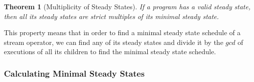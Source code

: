 \documentclass{sig-alt-full}
\newtheorem{theorem}{Theorem}
\newtheorem{corollary}{Corollary}
\begin{document}
\begin{comment}
The above lemma is true because neither $m$ nor $q$ change the
amount of data buffered in the {\Channels}.  Thus a composition of
the steady states does not change the amount of data buffered in
the {\Channels}, which makes the composition also a steady schedule.

\begin{corollary}[Composition of Steady Schedules]
\label{corollary:composition}
If $m$ and $q$ are two steady states, and $\forall i, m_i > q_i$,
then $w = m - q$ is also a steady state.
\end{corollary}

If $q$ is a steady state and $m = w + q$ is a steady state, then
$w$ must not change the amount of data buffered in {\Channels}. Thus
$w$ must be a steady state.
\end{comment}

\begin{theorem}[Multiplicity of Steady States] If a
{\StreamIt} program has a valid steady state, then all its steady
states are strict multiples of its minimal steady state.
\label{thm:multiplicity}
\end{theorem}

\begin{comment}
\begin{proof}[Multiplicity of Minimal Steady State]
Assume that there exists a steady state that is not a multiple of
the minimal steady state.  Let $m$ denote the minimal steady
state. Let $q$ denote the other steady state.  Note that $w = q -
m$ is still a steady state, as long as all elements of $w$ remain
non-negative (by Corollary \ref{corollary:composition}).  Repeat
subtracting $m$ from $q$ until no more subtractions can be
performed without generating at least one negative element in
vector $w$.  Since $q$ is not a multiple of $m$, $w \ne 0$. But
since we cannot subtract $m$ from $w$ any further, $\exists i, m_i
> w_i$.  Since $m$ is a minimal steady state and $w$ is a steady
state, this is impossible due to Corollary
\ref{corollary:minimal-state}. Thus there are no steady states
that are not multiples of the minimal steady schedule.
\end{proof}
\end{comment}

This property means that in order to find a minimal steady state
schedule of a stream operator, we can find any of its steady states
and divide it by the $gcd$ of executions of all its children to find
the minimal steady state schedule.

\subsubsection{Calculating Minimal Steady States}
\label{sec:calc-min-steady}
\end{document}
